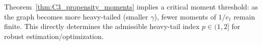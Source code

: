 \documentclass[12pt,a4paper]{article}
\begin{document}
\begin{remark}
Theorem~\ref{thm:C3_propensity_moments} implies a critical moment threshold:
as the graph becomes more heavy-tailed (smaller $\gamma$), fewer moments of $1/e_t$ remain finite.
This directly determines the admissible heavy-tail index $p\in(1,2]$ for robust estimation/optimization.
\end{remark}



\end{document}
